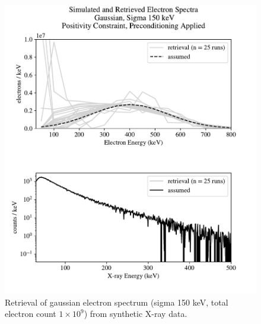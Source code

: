 \begin{figure}[p]
    \centering
    \includegraphics[width=\textwidth]{figures/chapter_4/synthetic_data_examples/gauss_150keV_posonly_preconditioning_1e9_particles}
    \caption{Retrieval of gaussian electron spectrum (sigma 150 keV, total electron count $1\times10^9$) from synthetic X-ray data.}
    \label{why_non_negative_is_good}
\end{figure}

